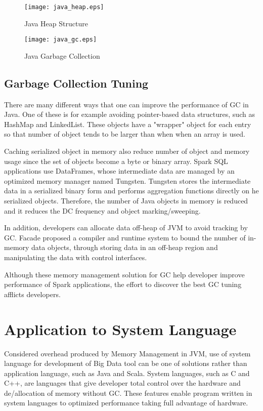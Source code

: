 \begin{figure}[htb]
    \texttt{[image: java\_heap.eps]}
    \caption{Java Heap Structure}
    \label{fig:javaheap}
\end{figure}

\begin{figure}[htb]
    \texttt{[image: java\_gc.eps]}
    \caption{Java Garbage Collection}
    \label{fig:javagc}
\end{figure}


\subsection{Garbage Collection Tuning}
There are many different ways that one can improve the performance of GC in Java. One of these is for example avoiding pointer-based data structures, such as HashMap and LinkedList. 
These objects have a "wrapper" object for each entry so that number of object tends to be larger than when when an array is used.

Caching serialized object in memory also reduce number of object and memory usage since the set of objects become a byte or binary array. 
Spark SQL applications use DataFrames\cite{DBLP:conf/sigmod/ArmbrustXLHLBMK15}, 
whose intermediate data are managed by an optimized memory manager named Tungsten.
Tungsten stores the intermediate data in a serialized binary form and performs aggregation functions directly on he serialized objects.
Therefore, the number of Java objects in memory is reduced and it reduces the DC frequency and object marking/sweeping. 

In addition, developers can allocate data off-heap of JVM to avoid tracking by GC. 
Facade\cite{DBLP:conf/asplos/NguyenWBFHX15} proposed a compiler and runtime system to bound the number of in-memory data objects, through storing data in an off-heap region and 
manipulating the data with control interfaces.

Although these memory management solution for GC help developer improve performance of Spark applications, 
the effort to discover the best GC tuning afflicts developers.

\section{Application to System Language}
\label{sec:history}
Considered overhead produced by Memory Management in JVM, use of system language for development of Big Data tool can be one of solutions rather than application language, such as Java and Scala. 
System languages, such as C and C++, are languages that give developer total control over the hardware and de/allocation of memory without GC. 
These features enable program written in system languages to optimized performance taking full advantage of hardware. 


